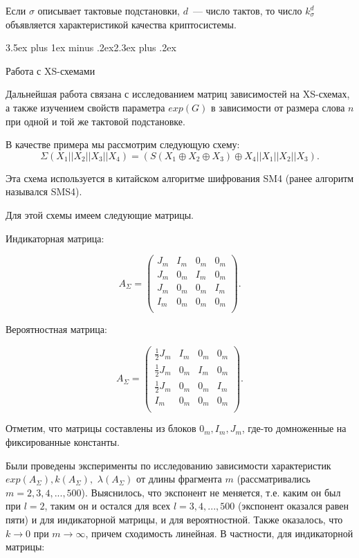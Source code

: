 \documentclass[a4paper,12pt]{report}
\makeatletter
\theoremstyle{plain} %
\theoremstyle{definition}
\theoremstyle{remark}
\renewcommand{\section}{\@startsection{section}{1}{18pt}%
{3.5ex plus 1ex minus .2ex}{2.3ex plus .2ex}%
{\normalfont\Large\bfseries\raggedright}}%
\makeatother
\begin{document}
\begin{large}
Если $\sigma$ описывает тактовые подстановки, $d$~--- число тактов,
то число $k_\sigma^d$ объявляется характеристикой качества криптосистемы.

\section{Работа с XS-схемами}

Дальнейшая работа связана с исследованием матриц зависимостей на XS-схемах, а также изучением свойств параметра $exp(G)$ в зависимости от размера слова $n$ при одной и той же тактовой подстановке.

В качестве примера мы рассмотрим следующую схему: 
$$\Sigma(X_1||X_2||X_3||X_4)=(S(X_1\oplus X_2 \oplus X_3)\oplus X_4 || X_1 || X_2 || X_3).$$

Эта схема используется в китайском алгоритме шифрования SM4 (ранее алгоритм назывался SMS4).

Для этой схемы имеем следующие матрицы.

Индикаторная матрица:

$$
A_{\Sigma} = 
\begin{pmatrix} 
J_m & I_m & 0_m & 0_m\\ 
J_m & 0_m & I_m & 0_m\\
 J_m & 0_m & 0_m & I_m\\
I_m &  0_m  & 0_m & 0_m\\
\end{pmatrix}.
$$

Вероятностная матрица:

$$
A_{\Sigma} = 
\begin{pmatrix} 
\frac{1}{2}
J_m & I_m & 0_m & 0_m\\ 
\frac{1}{2}J_m & 0_m & I_m & 0_m\\
\frac{1}{2} J_m & 0_m & 0_m & I_m\\
I_m &  0_m  & 0_m & 0_m\\
\end{pmatrix}.
$$

Отметим, что матрицы составлены из блоков $0_m, I_m, J_m$, где-то домноженные на фиксированные константы.

Были проведены эксперименты по исследованию зависимости характеристик $exp(A_{\Sigma}), k(A_{\Sigma}),$ $\lambda(A_{\Sigma})$ от длины фрагмента $m$ (рассматривались $m=2,3,4,...,500$). Выяснилось, что экспонент не меняется, т.е. каким он был при $l=2$, таким он и остался для всех $l=3,4,...,500$ (экспонент оказался равен пяти) и для индикаторной матрицы, и для вероятностной. Также оказалось, что $k \rightarrow 0$ при $m \rightarrow \infty$, причем сходимость линейная. В частности, для индикаторной матрицы:


\end{large}
\end{document}

